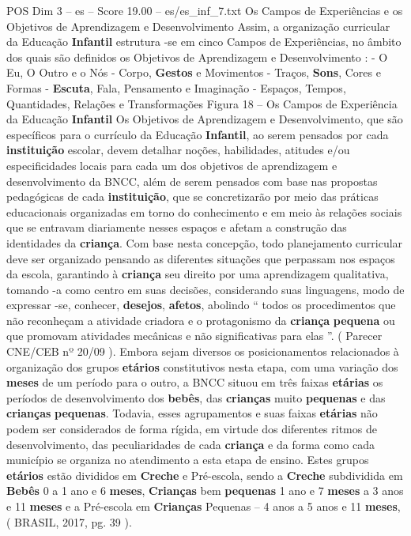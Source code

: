 \begin{textsample}{POS Dim 3 – es – Score 19.00 – es/es\_inf\_7.txt}  \label{ex:f3_pos_118}
Os Campos de Experiências e os Objetivos de Aprendizagem e Desenvolvimento Assim, a organização curricular da Educação \textbf{Infantil} estrutura -se em cinco Campos de Experiências, no âmbito dos quais são definidos os Objetivos de Aprendizagem e Desenvolvimento : - O Eu, O Outro e o Nós - Corpo, \textbf{Gestos} e Movimentos - Traços, \textbf{Sons}, Cores e Formas - \textbf{Escuta}, Fala, Pensamento e Imaginação - Espaços, Tempos, Quantidades, Relações e Transformações Figura 18 – Os Campos de Experiência da Educação \textbf{Infantil} Os Objetivos de Aprendizagem e Desenvolvimento, que são específicos para o currículo da Educação \textbf{Infantil}, ao serem pensados por cada \textbf{instituição} escolar, devem detalhar noções, habilidades, atitudes e/ou especificidades locais para cada um dos objetivos de aprendizagem e desenvolvimento da BNCC, além de serem pensados com base nas propostas pedagógicas de cada \textbf{instituição}, que se concretizarão por meio das práticas educacionais organizadas em torno do conhecimento e em meio às relações sociais que se entravam diariamente nesses espaços e afetam a construção das identidades da \textbf{criança}.
Com base nesta concepção, todo planejamento curricular deve ser organizado pensando as diferentes situações que perpassam nos espaços da escola, garantindo à \textbf{criança} seu direito por uma aprendizagem qualitativa, tomando -a como centro em suas decisões, considerando suas linguagens, modo de expressar -se, conhecer, \textbf{desejos}, \textbf{afetos}, abolindo “ todos os procedimentos que não reconheçam a atividade criadora e o protagonismo da \textbf{criança} \textbf{pequena} ou que promovam atividades mecânicas e não significativas para elas ”. ( Parecer CNE/CEB nº 20/09 ).
Embora sejam diversos os posicionamentos relacionados à organização dos grupos \textbf{etários} constitutivos nesta etapa, com uma variação dos \textbf{meses} de um período para o outro, a BNCC situou em três faixas \textbf{etárias} os períodos de desenvolvimento dos \textbf{bebês}, das \textbf{crianças} muito \textbf{pequenas} e das \textbf{crianças} \textbf{pequenas}.
Todavia, esses agrupamentos e suas faixas \textbf{etárias} não podem ser considerados de forma rígida, em virtude dos diferentes ritmos de desenvolvimento, das peculiaridades de cada \textbf{criança} e da forma como cada município se organiza no atendimento a esta etapa de ensino.
Estes grupos \textbf{etários} estão divididos em \textbf{Creche} e Pré-escola, sendo a \textbf{Creche} subdividida em \textbf{Bebês} 0 a 1 ano e 6 \textbf{meses}, \textbf{Crianças} bem \textbf{pequenas} 1 ano e 7 \textbf{meses} a 3 anos e 11 \textbf{meses} e a Pré-escola em \textbf{Crianças} Pequenas – 4 anos a 5 anos e 11 \textbf{meses}, ( BRASIL, 2017, pg. 39 ).

\end{textsample}
